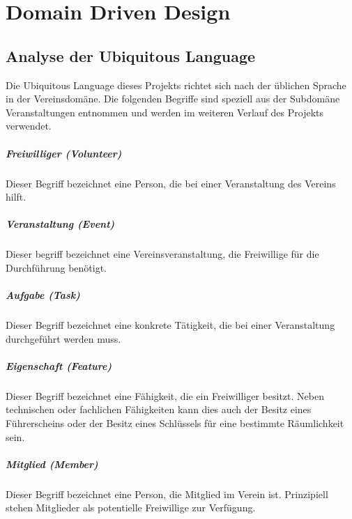 \chapter{Domain Driven Design}
\label{chapter:domain_driven_design}

\section{Analyse der Ubiquitous Language}
\label{section:analyse_der_ubiquitous_language}

Die Ubiquitous Language dieses Projekts richtet sich nach der üblichen Sprache in der Vereinsdomäne. Die folgenden Begriffe sind speziell aus der Subdomäne \glqq Veranstaltungen\grqq{} entnommen und werden im weiteren Verlauf des Projekts verwendet.

\paragraph{\glqq Freiwilliger\grqq{} (Volunteer)}
Dieser Begriff bezeichnet eine Person, die bei einer Veranstaltung des Vereins hilft.

\paragraph{\glqq Veranstaltung\grqq{} (Event)}
Dieser begriff bezeichnet eine Vereinsveranstaltung, die Freiwillige für die Durchführung benötigt.

\paragraph{\glqq Aufgabe\grqq{} (Task)}
Dieser Begriff bezeichnet eine konkrete Tätigkeit, die bei einer Veranstaltung durchgeführt werden muss.

\paragraph{\glqq Eigenschaft\grqq{} (Feature)}
Dieser Begriff bezeichnet eine Fähigkeit, die ein Freiwilliger besitzt. Neben technischen oder fachlichen Fähigkeiten kann dies auch der Besitz eines Führerscheins oder der Besitz eines Schlüssels für eine bestimmte Räumlichkeit sein.

\paragraph{\glqq Mitglied\grqq{} (Member)}
Dieser Begriff bezeichnet eine Person, die Mitglied im Verein ist. Prinzipiell stehen Mitglieder als potentielle Freiwillige zur Verfügung.

